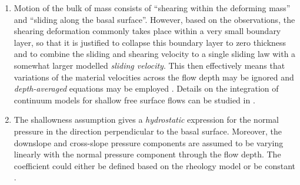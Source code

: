 \documentclass{article}
\begin{document}
\begin{enumerate}
\item Motion of the bulk of mass consists of ``shearing within the deforming mass'' and ``sliding along the basal surface''. However, based on the observations, the shearing deformation commonly takes place within a very small boundary layer, so that it is justified to collapse this boundary layer to zero thickness and to combine the sliding and shearing velocity to a single sliding law with a somewhat larger modelled \textit{sliding velocity}. This then effectively means that variations of the material velocities across the flow depth may be ignored and \textit{depth-averaged} equations may be employed \citep{SavageHutter,Hutter1993}. Details on the integration of continuum models for shallow free surface flows can be studied in \citep{PudasainiHutter2007}.%
\item The shallowness assumption gives a \textit{hydrostatic} expression for the normal pressure in the direction perpendicular to the basal surface. Moreover, the downslope and cross-slope pressure components are assumed to be varying linearly with the normal pressure component through the flow depth. The coefficient could either be defined based on the rheology model or be constant \citep{SavageHutter,Bartelt1999,Iverson2001,Denlinger2001}.
\end{enumerate}
\end{document}
